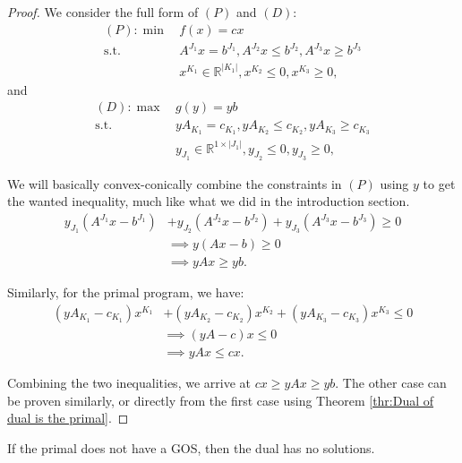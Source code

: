 \begin{proof}
  We consider the full form of \( (P) \) and \( (D) \):
  \begin{align*}
    (P): \min\,&f(x) = cx\\
    \text{s.t.}\,&A^{J_{1}}x = b^{J_{1}}, A^{J_{2}}x \le b^{J_{2}}, A^{J_{3}}x
    \ge b^{J_{3}}\\
                 &x^{K_{1}} \in \mathbb{R}^{|K_{1}|}, x^{K_{2}} \le 0, x^{K_{3}}
                 \ge 0
  ,\end{align*} and
  \begin{align*}
    (D): \max\,&g(y) = yb\\
    \text{s.t.}\,&yA_{K_{1}} = c_{K_{1}}, yA_{K_{2}} \le c_{K_{2}}, yA_{K_{3}}
    \ge c_{K_{3}}\\
                 &y_{J_{1}} \in \mathbb{R}^{1\times |J_{1}|}, y_{J_{2}} \le 0,
                 y_{J_{3}} \ge 0,
  \end{align*}

We will basically convex-conically combine the constraints in \( (P) \) using \(
y\) to get the wanted inequality, much like what we did in the introduction
section.
\begin{align*}
  y_{J_{1}}(A^{J_{1}}x-b^{J_{1}}) &+
  y_{J_{2}}(A^{J_{2}}x-b^{J_{2}}) +
  y_{J_{3}}(A^{J_{3}}x-b^{J_{3}}) \ge 0\\
                                  &\implies y(Ax - b) \ge 0\\
                                  &\implies yAx \ge  yb
.\end{align*}

Similarly, for the primal program, we have:
\begin{align*}
  (yA_{K_{1}}-c_{K_{1}})x^{K_{1}} &+
  (yA_{K_{2}}-c_{K_{2}})x^{K_{2}} +
  (yA_{K_{3}}-c_{K_{3}})x^{K_{3}} \le 0\\
                                  &\implies (yA - c)x \le 0 \\
                                  &\implies yAx \le cx
.\end{align*}

Combining the two inequalities, we arrive at \( cx \ge  yAx \ge  yb \). The
other case can be proven similarly, or directly from the first case using
Theorem \ref{thr:Dual of dual is the primal}.
\end{proof}

\begin{corollary}
\label{cor:Existence of solutions in dual linear programs}
  If the primal does not have a GOS, then the dual has no solutions.
\end{corollary}

